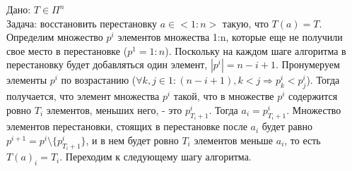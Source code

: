 Дано: $T \in \Pi^n$\\
Задача: восстановить перестановку $a \in <1:n>$ такую, что $T(a) = T$.
Определим множество $p^i$ элементов множества 1:n, которые еще не получили свое место в перестановке ($p^1 = 1:n$). Поскольку на каждом шаге алгоритма в перестановку будет добавляться один элемент, $|p^i| = n - i + 1$. Пронумеруем элементы $p^i$ по возрастанию ($\forall k, j \in 1:(n - i + 1), k < j \Rightarrow p^i_k < p^i_j$). Тогда получается, что элемент множества $p^i$ такой, что в множестве $p^i$ содержится ровно $T_i$ элементов, меньших него, - это $p^i_{T_i + 1}$. Тогда $a_i = p^i_{T_i + 1}$. Множество элементов перестановки, стоящих в перестановке после $a_i$ будет равно $p^{i + 1} = p^i \setminus \{p^i_{T_i + 1}\}$, и в нем будет ровно $T_i$ элементов меньше $a_i$, то есть $T(a)_i = T_i$. Переходим к следующему шагу алгоритма.\\

